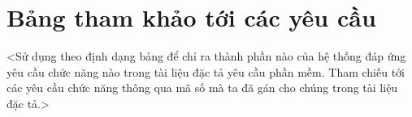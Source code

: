 
\clearpage

\section{Bảng tham khảo tới các yêu cầu }

<Sử dụng theo định dạng bảng để chỉ ra thành phần nào của hệ thống đáp ứng yêu cầu chức 
năng nào trong tài liệu đặc tả yêu cầu phần mềm. Tham chiếu tới các yêu cầu chức năng thông 
qua mã số mà ta đã gán cho chúng trong tài liệu đặc tả.> 